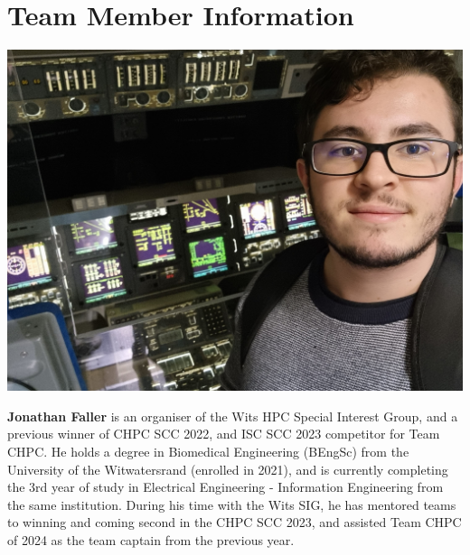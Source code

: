 \documentclass[10pt, onecolumn]{IEEEtran}
\begin{document}
\section{Team Member Information}
\vspace{0.02\textwidth} 
\noindent
\begin{minipage}{0.2\textwidth}
  \includegraphics[width=\textwidth]{Jono_bio_pic.jpg}
\end{minipage}
\hspace{0.02\textwidth} %
\begin{minipage}{0.65\textwidth}
\textbf{Jonathan Faller} is an organiser of the Wits HPC Special Interest Group, and a previous winner of CHPC SCC 2022, and ISC SCC 2023 competitor for Team CHPC. He holds a degree in Biomedical Engineering (BEngSc) from the University of the Witwatersrand (enrolled in 2021), and is currently completing the 3rd year of study in Electrical Engineering - Information Engineering from the same institution. During his time with the Wits SIG, he has mentored teams to winning and coming second in the CHPC SCC 2023, and assisted Team CHPC of 2024 as the team captain from the previous year.
\end{minipage}
\\\\\\
\noindent
\end{document}

